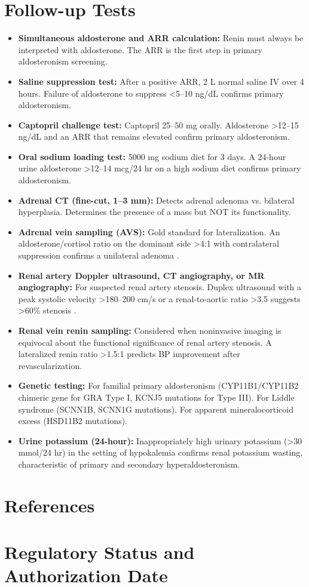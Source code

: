 \section*{Follow-up Tests}
\begin{itemize}
  \item \textbf{Simultaneous aldosterone and ARR calculation:} Renin must always be interpreted with aldosterone. The ARR is the first step in primary aldosteronism screening.
  \item \textbf{Saline suppression test:} After a positive ARR, 2 L normal saline IV over 4 hours. Failure of aldosterone to suppress <5--10 ng/dL confirms primary aldosteronism.
  \item \textbf{Captopril challenge test:} Captopril 25--50 mg orally. Aldosterone >12--15 ng/dL and an ARR that remains elevated confirm primary aldosteronism.
  \item \textbf{Oral sodium loading test:} 5000 mg sodium diet for 3 days. A 24-hour urine aldosterone >12--14 mcg/24 hr on a high sodium diet confirms primary aldosteronism.
  \item \textbf{Adrenal CT (fine-cut, 1--3 mm):} Detects adrenal adenoma vs. bilateral hyperplasia. Determines the presence of a mass but NOT its functionality.
  \item \textbf{Adrenal vein sampling (AVS):} Gold standard for lateralization. An aldosterone/cortisol ratio on the dominant side >4:1 with contralateral suppression confirms a unilateral adenoma \cite{rossi2014expert}.
  \item \textbf{Renal artery Doppler ultrasound, CT angiography, or MR angiography:} For suspected renal artery stenosis. Duplex ultrasound with a peak systolic velocity >180--200 cm/s or a renal-to-aortic ratio >3.5 suggests >60\% stenosis \cite{rimoldi2014secondary}.
  \item \textbf{Renal vein renin sampling:} Considered when noninvasive imaging is equivocal about the functional significance of renal artery stenosis. A lateralized renin ratio >1.5:1 predicts BP improvement after revascularization.
  \item \textbf{Genetic testing:} For familial primary aldosteronism (CYP11B1/CYP11B2 chimeric gene for GRA Type I, KCNJ5 mutations for Type III). For Liddle syndrome (SCNN1B, SCNN1G mutations). For apparent mineralocorticoid excess (HSD11B2 mutations).
  \item \textbf{Urine potassium (24-hour):} Inappropriately high urinary potassium (>30 mmol/24 hr) in the setting of hypokalemia confirms renal potassium wasting, characteristic of primary and secondary hyperaldosteronism.
\end{itemize}

\section*{References}



\clearpage
\section*{Regulatory Status and Authorization Date}

\clearpage

